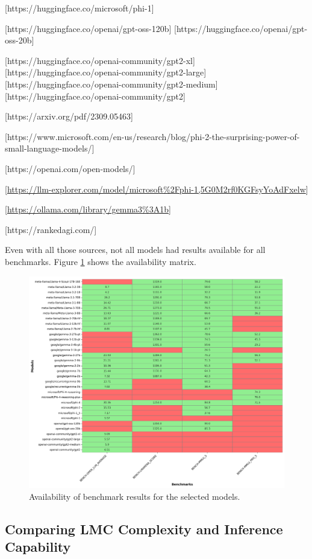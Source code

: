         [https://huggingface.co/microsoft/phi-1]


        [https://huggingface.co/openai/gpt-oss-120b]
        [https://huggingface.co/openai/gpt-oss-20b]

        [https://huggingface.co/openai-community/gpt2-xl]
        [https://huggingface.co/openai-community/gpt2-large]
        [https://huggingface.co/openai-community/gpt2-medium]
        [https://huggingface.co/openai-community/gpt2]


        [https://arxiv.org/pdf/2309.05463]

        [https://www.microsoft.com/en-us/research/blog/phi-2-the-surprising-power-of-small-language-models/]

        [https://openai.com/open-models/]

        [\url{https://llm-explorer.com/model/microsoft%2Fphi-1,5G0M2rf0KGFsyYoAdFxelw}]

        [\url{https://ollama.com/library/gemma3%3A1b}]

        [https://rankedagi.com/]


        Even with all those sources, not all models had results available for all benchmarks. Figure \ref{fig:benchmark_availability} shows the availability matrix.

        \begin{figure}[H]
            \includegraphics[width=\linewidth]{img/benchmark_availability.png}
            \caption{Availability of benchmark results for the selected models.}
            \label{fig:benchmark_availability}
        \end{figure}

\subsection{Comparing LMC Complexity and Inference Capability}



